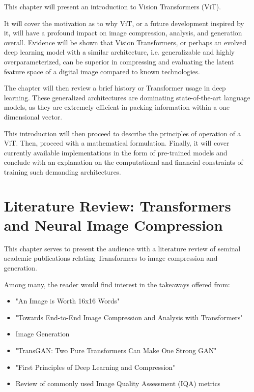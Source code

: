 \documentclass[pdftex,11pt,titlepage,twoside,openright]{report}
\begin{document}
This chapter will present an introduction to Vision Transformers (ViT).

It will cover the motivation as to why ViT, or a future development inspired by it,
will have a profound impact on image compression, analysis, and generation overall.
Evidence will be shown that Vision Transformers, or perhaps an evolved deep learning model with a
similar architecture, i.e. generalizable and highly overparameterized, can be superior in
compressing and evaluating the latent feature space of a digital image compared to known
technologies.

The chapter will then review a brief history or Transformer usage in deep learning.
These generalized architectures are dominating state-of-the-art language models,
as they are extremely efficient in packing information within a one dimensional vector.

This introduction will then proceed to describe the principles of operation of a ViT. Then, proceed with
a mathematical formulation. Finally, it will cover currently available implementations
in the form of pre-trained models and conclude with an explanation on the computational and
financial constraints of training such demanding architectures.

\ThinHRule

\newpage



\chapter{Literature Review: Transformers and Neural Image Compression}


This chapter serves to present the audience with a literature review of seminal academic
publications relating Transformers to image compression and generation.

Among many, the reader would find interest in the takeaways offered from:

\begin{itemize}
	\item "An Image is Worth 16x16 Words" \citep{dosovitskiy2020vit}
	\item "Towards End-to-End Image Compression and Analysis with Transformers" 
    
    \citep{Bai2022AAAI}
    \item Image Generation
	\item "TransGAN: Two Pure Transformers Can Make One Strong GAN" \citep{jiang2021transgan}
	\item "First Principles of Deep Learning and Compression" \citep{Principles}
	\item Review of commonly used Image Quality Assessment (IQA) metrics \citep{BRISQUE}
    
    \citep{Metrics}
\end{itemize}
\end{document}
